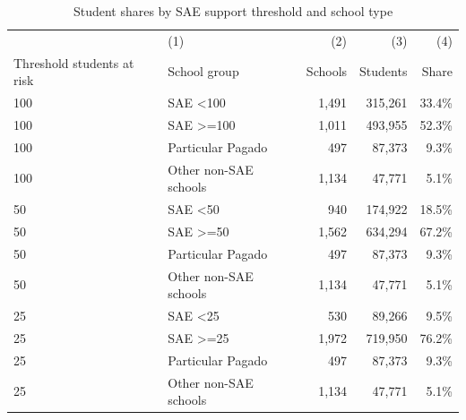 \begin{table}[!htbp]
\centering
\caption{Student shares by SAE support threshold and school type}
\label{tab:student_shares_by_sae_support_thresholds}
\begin{tabular}{llrrr}
\toprule
 & (1) & (2) & (3) & (4) \\
Threshold students at risk & School group & Schools & Students & Share \\
\midrule
100 & SAE <100 & 1,491 & 315,261 & 33.4\% \\
100 & SAE >=100 & 1,011 & 493,955 & 52.3\% \\
100 & Particular Pagado & 497 & 87,373 & 9.3\% \\
100 & Other non-SAE schools & 1,134 & 47,771 & 5.1\% \\
\midrule
50 & SAE <50 & 940 & 174,922 & 18.5\% \\
50 & SAE >=50 & 1,562 & 634,294 & 67.2\% \\
50 & Particular Pagado & 497 & 87,373 & 9.3\% \\
50 & Other non-SAE schools & 1,134 & 47,771 & 5.1\% \\
\midrule
25 & SAE <25 & 530 & 89,266 & 9.5\% \\
25 & SAE >=25 & 1,972 & 719,950 & 76.2\% \\
25 & Particular Pagado & 497 & 87,373 & 9.3\% \\
25 & Other non-SAE schools & 1,134 & 47,771 & 5.1\% \\
\bottomrule
\end{tabular}
\end{table}
